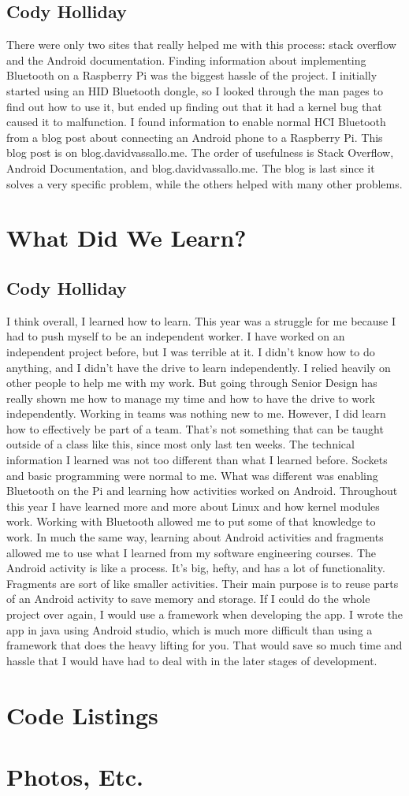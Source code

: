 \documentclass[draftclsnofoot,onecolumn,letterpaper,10pt]{IEEEtran}
\begin{document}
\subsection{Cody Holliday}
There were only two sites that really helped me with this process: stack overflow and the Android documentation.
Finding information about implementing Bluetooth on a Raspberry Pi was the biggest hassle of the project.
I initially started using an HID Bluetooth dongle, so I looked through the man pages to find out how to use it, but ended up finding out that it had a kernel bug that caused it to malfunction.
I found information to enable normal HCI Bluetooth from a blog post about connecting an Android phone to a Raspberry Pi.
This blog post is on blog.davidvassallo.me.
The order of usefulness is Stack Overflow, Android Documentation, and blog.davidvassallo.me.
The blog is last since it solves a very specific problem, while the others helped with many other problems.

\section{What Did We Learn?}
\subsection{Cody Holliday}
I think overall, I learned how to learn. This year was a struggle for me because I had to push myself to be an independent worker.
I have worked on an independent project before, but I was terrible at it.
I didn't know how to do anything, and I didn't have the drive to learn independently. 
I relied heavily on other people to help me with my work.
But going through Senior Design has really shown me how to manage my time and how to have the drive to work independently.
Working in teams was nothing new to me. However, I did learn how to effectively be part of a team.
That's not something that can be taught outside of a class like this, since most only last ten weeks.
The technical information I learned was not too different than what I learned before.
Sockets and basic programming were normal to me. What was different was enabling Bluetooth on the Pi and learning how activities worked on Android.
Throughout this year I have learned more and more about Linux and how kernel modules work.
Working with Bluetooth allowed me to put some of that knowledge to work.
In much the same way, learning about Android activities and fragments allowed me to use what I learned from my software engineering courses.
The Android activity is like a process. It's big, hefty, and has a lot of functionality.
Fragments are sort of like smaller activities. Their main purpose is to reuse parts of an Android activity to save memory and storage.
If I could do the whole project over again, I would use a framework when developing the app.
I wrote the app in java using Android studio, which is much more difficult than using a framework that does the heavy lifting for you.
That would save so much time and hassle that I would have had to deal with in the later stages of development.


\appendix
\section{Code Listings}
\section{Photos, Etc.}
\end{document}
